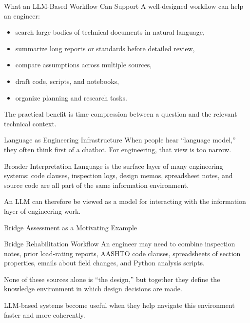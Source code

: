 \documentclass[12pt]{beamer}
\begin{document}
\begin{frame}{What an LLM-Based Workflow Can Support}
  A well-designed workflow can help an engineer:
  \begin{itemize}
    \item search large bodies of technical documents in natural language,
    \item summarize long reports or standards before detailed review,
    \item compare assumptions across multiple sources,
    \item draft code, scripts, and notebooks,
    \item organize planning and research tasks.
  \end{itemize}

  The practical benefit is time compression between a question and the relevant technical context.
\end{frame}

\begin{frame}{Language as Engineering Infrastructure}
  When people hear ``language model,'' they often think first of a chatbot. For engineering, that view is too narrow.

  \begin{conceptbox}{Broader Interpretation}
    Language is the surface layer of many engineering systems: code clauses, inspection logs, design memos, spreadsheet notes, and source code are all part of the same information environment.
  \end{conceptbox}

  An LLM can therefore be viewed as a model for interacting with the information layer of engineering work.
\end{frame}

\begin{frame}{Bridge Assessment as a Motivating Example}
  \begin{examplebox}{Bridge Rehabilitation Workflow}
    An engineer may need to combine inspection notes, prior load-rating reports, AASHTO code clauses, spreadsheets of section properties, emails about field changes, and Python analysis scripts.
  \end{examplebox}

  None of these sources alone is ``the design,'' but together they define the knowledge environment in which design decisions are made.

  LLM-based systems become useful when they help navigate this environment faster and more coherently.
\end{frame}
\end{document}
